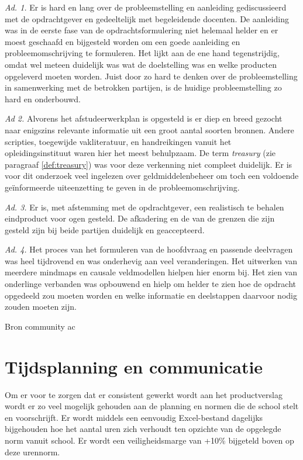 \documentclass[10pt,a4paper,oneside]{report}
\begin{document}
\noindent
\textit{Ad. 1.} Er is hard en lang over de probleemstelling en aanleiding gediscussieerd met de opdrachtgever en gedeeltelijk met begeleidende docenten. De aanleiding was in de eerste fase van de opdrachtsformulering niet helemaal helder en er moest geschaafd en bijgesteld worden om een goede aanleiding en probleemomschrijving te formuleren. Het lijkt aan de ene hand tegenstrijdig, omdat wel meteen duidelijk was wat de doelstelling was en welke producten opgeleverd moeten worden. Juist door zo hard te denken over de probleemstelling in samenwerking met de betrokken partijen, is de huidige probleemstelling zo hard en onderbouwd. 

\bigskip
\noindent
\textit{Ad 2.} Alvorens het afstudeerwerkplan is opgesteld is er diep en breed gezocht naar enigszins relevante informatie uit een groot aantal soorten bronnen. Andere scripties, toegewijde vakliteratuur, en handreikingen vanuit het opleidingsinstituut waren hier het meest behulpzaam. De term \textit{treasury} (zie paragraaf \ref{def:treasury}) was voor deze verkenning niet compleet duidelijk. Er is voor dit onderzoek veel ingelezen over geldmiddelenbeheer om toch een voldoende geïnformeerde uiteenzetting te geven in de probleemomschrijving. 

\bigskip
\noindent
\textit{Ad. 3.} Er is, met afstemming met de opdrachtgever, een realistisch te behalen eindproduct voor ogen gesteld. De afkadering en de van de grenzen die zijn gesteld zijn bij beide partijen duidelijk en geaccepteerd.

\bigskip
\noindent
\textit{Ad. 4.} Het proces van het formuleren van de hoofdvraag en passende deelvragen was heel tijdrovend en was onderhevig aan veel veranderingen. Het uitwerken van meerdere mindmaps en causale veldmodellen hielpen hier enorm bij. Het zien van onderlinge verbanden was opbouwend en hielp om helder te zien hoe de opdracht opgedeeld zou moeten worden en welke informatie en deelstappen daarvoor nodig zouden moeten zijn.

\bigskip
\noindent
\color{red} Bron community ac \color{black}

\chapter{Tijdsplanning en communicatie}
Om er voor te zorgen dat er consistent gewerkt wordt aan het productverslag wordt er zo veel mogelijk gehouden aan de planning en normen die de school stelt en voorschrijft. Er wordt middels een eenvoudig Excel-bestand dagelijks bijgehouden hoe het aantal uren zich verhoudt ten opzichte van de opgelegde norm vanuit school. Er wordt een veiligheidsmarge van +10\% bijgeteld boven op deze urennorm. 
\end{document}
